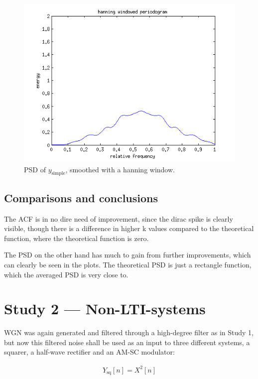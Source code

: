 \documentclass[10pt]{article}
\begin{document}
\begin{figure}[!hp]
    \begin{center}
      \includegraphics[width=1\textwidth]{simple_periodogram_hanning}
    \caption{PSD of $y_\text{simple}$, smoothed with a hanning window. \label{fig:TheoACFsimple}}
    \end{center}
\end{figure}


\subsection{Comparisons and conclusions}
The ACF is in no dire need of improvement, since the dirac spike is clearly visible, though there is a difference in higher k values compared to the theoretical function, where the theoretical function is zero.

The PSD on the other hand has much to gain from further improvements, which can clearly be seen in the plots. The theoretical PSD is just a rectangle function, which the averaged PSD is very close to.


\section{Study 2 --- Non-LTI-systems}
WGN was again generated and filtered through a high-degree filter as in Study 1, but now this filtered noise shall be used as an input to three different systems, a squarer, a half-wave rectifier and an AM-SC modulator:

\begin{align*}
  Y_\text{sq}[n] =X^2[n]
\end{align*}
\end{document}
